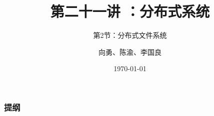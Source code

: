 


\title[第21讲]{第二十一讲 ：分布式系统} %
\subtitle{第2节：分布式文件系统}
\author{向勇、陈渝、李国良} %
\date{\today} %


    
    \begin{frame}
        \titlepage %
    \end{frame}
    
    \begin{frame}
        \frametitle{提纲} %
        \tableofcontents %
        
        
    \end{frame}
